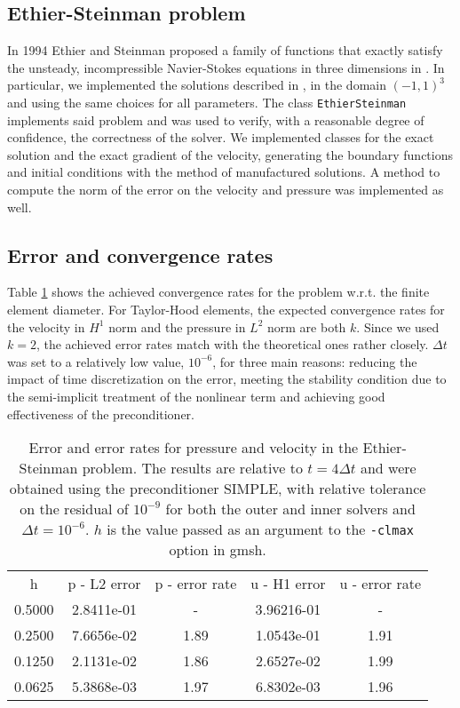\subsection{Ethier-Steinman problem}
In 1994 Ethier and Steinman proposed a family of functions that exactly satisfy the unsteady, incompressible Navier-Stokes equations in three dimensions in \cite{EthierSteinman}. In particular, we implemented the solutions described in \cite{Quarteroni}, in the domain $(-1, 1)^3$ and using the same choices for all parameters. The class \texttt{EthierSteinman} implements said problem and was used to verify, with a reasonable degree of confidence, the correctness of the solver. We implemented classes for the exact solution and the exact gradient of the velocity, generating the boundary functions and initial conditions with the method of manufactured solutions. A method to compute the norm of the error on the velocity and pressure was implemented as well.

\subsection{Error and convergence rates}
Table \ref{tab:convergence} shows the achieved convergence rates for the problem w.r.t. the finite element diameter. For Taylor-Hood elements, the expected convergence rates for the velocity in $H^1$ norm and the pressure in $L^2$ norm are both $k$. Since we used $k=2$, the achieved error rates match with the theoretical ones rather closely. $\Delta t$ was set to a relatively low value, $10^{-6}$, for three main reasons: reducing the impact of time discretization on the error, meeting the stability condition due to the semi-implicit treatment of the nonlinear term and achieving good effectiveness of the preconditioner.

\begin{table}[h]
    \centering
    \begin{tabular}{c|c|c|c|c}
        h & p - L2 error & p - error rate & u - H1 error & u - error rate \\
        0.5000 & 2.8411e-01 &    - & 3.96216-01 &    -\\
        0.2500 & 7.6656e-02 & 1.89 & 1.0543e-01 & 1.91\\
        0.1250 & 2.1131e-02 & 1.86 & 2.6527e-02 & 1.99\\
        0.0625 & 5.3868e-03 & 1.97 & 6.8302e-03 & 1.96\\
    \end{tabular}
    \caption{Error and error rates for pressure and velocity in the Ethier-Steinman problem. The results are relative to $t = 4\Delta t$ and were obtained using the preconditioner SIMPLE, with relative tolerance on the residual of $10^{-9}$ for both the outer and inner solvers and $\Delta t = 10^{-6}$. $h$ is the value passed as an argument to the \texttt{-clmax} option in gmsh.}
    \label{tab:convergence}
\end{table}
